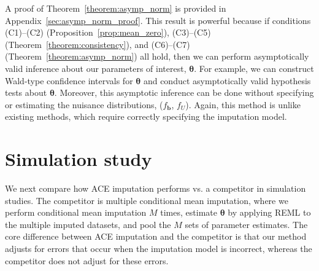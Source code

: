 \documentclass[12pt]{article}
\def\btheta{{\boldsymbol{\theta}}}
\def\bb{{\boldsymbol b}}
\begin{document}
A proof of Theorem~\ref{theorem:asymp_norm} is provided in Appendix~\ref{sec:asymp_norm_proof}. This result is powerful because if conditions (C1)--(C2) (Proposition~\ref{prop:mean_zero}), (C3)--(C5) (Theorem~\ref{theorem:consistency}), and (C6)--(C7) (Theorem~\ref{theorem:asymp_norm}) all hold, then we can perform asymptotically valid inference about our parameters of interest, $\btheta$. For example, we can construct Wald-type confidence intervals for $\btheta$ and conduct asymptotically valid hypothesis tests about $\btheta$. Moreover, this asymptotic inference can be done without specifying or estimating the nuisance distributions, ($f_{\bb}$, $f_U$). Again, this method is unlike existing methods, which require correctly specifying the imputation model.

\section{Simulation study}
\label{sec:simulation}

We next compare how ACE imputation performs vs. a competitor in simulation studies. The competitor is multiple conditional mean imputation, where we perform conditional mean imputation $M$ times, estimate $\btheta$ by applying REML to the multiple imputed datasets, and pool the $M$ sets of parameter estimates. The core difference between ACE imputation and the competitor is that our method adjusts for errors that occur when the imputation model is incorrect, whereas the competitor does not adjust for these errors. 

\end{document}
